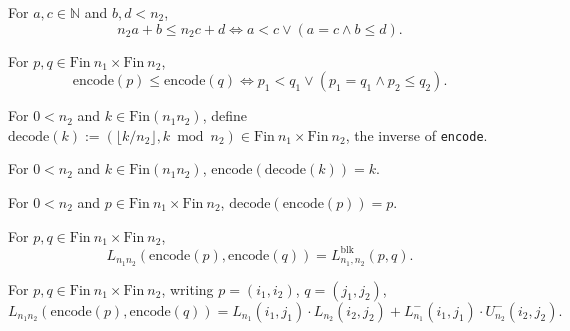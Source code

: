 \begin{lemma}
  \label{lem:flat_le_iff}
  \leanok
  For $a, c \in \mathbb{N}$ and $b, d < n_2$,
  \[
    n_2 a + b \le n_2 c + d \iff a < c \lor (a = c \land b \le d).
  \]
\end{lemma}

\begin{lemma}
  \label{lem:encode_le}
  \leanok
  For $p, q \in \mathrm{Fin}\ n_1 \times \mathrm{Fin}\ n_2$,
  \[
    \mathrm{encode}(p) \le \mathrm{encode}(q) \iff
      p_1 < q_1 \lor (p_1 = q_1 \land p_2 \le q_2).
  \]
\end{lemma}

\begin{definition}
  \label{def:decode}
  \leanok
  For $0 < n_2$ and $k \in \mathrm{Fin}(n_1 n_2)$, define
  $\mathrm{decode}(k) := (\lfloor k / n_2 \rfloor, k \bmod n_2) \in
  \mathrm{Fin}\ n_1 \times \mathrm{Fin}\ n_2$, the inverse of
  \texttt{encode}.
\end{definition}

\begin{lemma}
  \label{lem:encode_decode}
  \leanok
  For $0 < n_2$ and $k \in \mathrm{Fin}(n_1 n_2)$,
  $\mathrm{encode}(\mathrm{decode}(k)) = k$.
\end{lemma}

\begin{lemma}
  \label{lem:decode_encode}
  \leanok
  For $0 < n_2$ and $p \in \mathrm{Fin}\ n_1 \times \mathrm{Fin}\ n_2$,
  $\mathrm{decode}(\mathrm{encode}(p)) = p$.
\end{lemma}

\begin{lemma}
  \label{lem:L_encode}
  \leanok
  For $p, q \in \mathrm{Fin}\ n_1 \times \mathrm{Fin}\ n_2$,
  \[
    L_{n_1 n_2}(\mathrm{encode}(p), \mathrm{encode}(q)) = L^{\mathrm{blk}}_{n_1,n_2}(p,q).
  \]
\end{lemma}

\begin{theorem}
  \label{thm:theorem1_flat}
  \leanok
  For $p, q \in \mathrm{Fin}\ n_1 \times \mathrm{Fin}\ n_2$, writing
  $p = (i_1,i_2)$, $q = (j_1,j_2)$,
  \[
    L_{n_1 n_2}(\mathrm{encode}(p), \mathrm{encode}(q))
      = L_{n_1}(i_1,j_1) \cdot L_{n_2}(i_2,j_2)
        + L^-_{n_1}(i_1,j_1) \cdot U^-_{n_2}(i_2,j_2).
  \]
\end{theorem}

